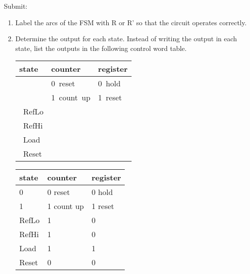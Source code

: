 \begin{enumerate}
        Submit:
        \begin{enumerate}
            \item Label the arcs of the FSM with R or R' so that the
                circuit operates correctly.
            \item Determine the output for each state.  Instead of writing the
                output in each state, list the outputs in the following control
                word table. \\
                \begin{onlyproblem}
                    \begin{tabular}{l||l|l}state&counter&register\\\hline&0~reset&0~hold\\\hline&1~count~up&1~reset\\\hline\hline~RefLo&&\\\hline~RefHi&&\\\hline~Load&&\\\hline~Reset&&\\
                    \end{tabular}
                \end{onlyproblem}
                \begin{onlysolution}\color{blue}
                    \begin{tabular}{l||l|l}
                        state   & counter       & register  \\ \hline
                        0   & 0 reset       & 0 hold    \\ \hline
                        1   & 1 count up    & 1 reset   \\ \hline \hline
                        RefLo   & 1             & 0         \\ \hline
                        RefHi   & 1             & 0         \\ \hline
                        Load    & 1             & 1         \\ \hline
                        Reset   & 0             & 0         \\
                    \end{tabular}
                \end{onlysolution}


\end{enumerate}
\end{enumerate}
